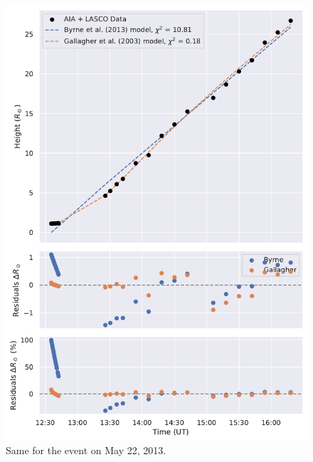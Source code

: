 \begin{figure}[!htp]
	\centering
	\includegraphics[width=0.8\hsize]{chapter2/figs/appendix/height_profile_residuals_aia_lasco_130522_01.pdf}
	\caption{Same for the event on May 22, 2013.}
\end{figure}

